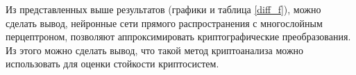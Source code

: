Из представленных выше результатов (графики и таблица \ref{diff_f}), можно сделать вывод,
нейронные сети прямого распространения с многослойным перцептроном, позволяют аппроксимировать криптографические преобразования.
Из этого можно сделать вывод, что такой метод криптоанализа можно использовать для оценки стойкости криптосистем.
  